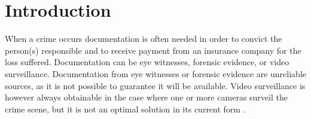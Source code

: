 \chapter{Introduction}
\label{chap:introduction}


When a crime occurs documentation is often needed in order to convict the person(s) responsible and to receive payment from an insurance company for the loss suffered.
Documentation can be eye witnesses, forensic evidence, or video surveillance.
Documentation from eye witnesses or forensic evidence are unreliable sources, as it is not possible to guarantee it will be available.
Video surveillance is however always obtainable in the case where one or more cameras surveil the crime scene, but it is not an optimal solution in its current form \citep{whats-wrong-public-video-surveillance}.







